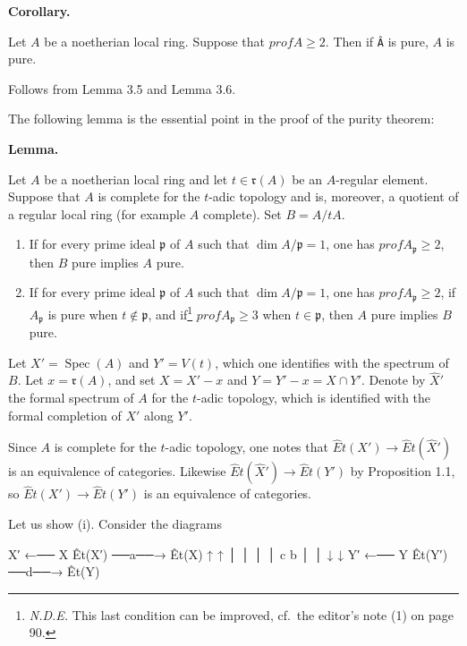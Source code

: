 \documentclass[
]{article}
\newenvironment{Shaded}{}{}
\newcommand{\NormalTok}[1]{#1}
\providecommand{\tightlist}{%
  \setlength{\itemsep}{0pt}\setlength{\parskip}{0pt}}
\begin{document}
\textbf{Corollary.}

Let \(A\) be a noetherian local ring. Suppose that
\(prof A \geqslant 2\). Then if \texttt{Â} is pure, \(A\) is pure.

Follows from Lemma 3.5 and Lemma 3.6.

The following lemma is the essential point in the proof of the purity
theorem:

\textbf{Lemma.}

Let \(A\) be a noetherian local ring and let \(t \in \mathfrak{r}(A)\)
be an \(A\)-regular element. Suppose that \(A\) is complete for the
\(t\)-adic topology and is, moreover, a quotient of a regular local ring
(for example \(A\) complete). Set \(B = A/tA\).

\begin{enumerate}
\def\labelenumi{\arabic{enumi}.}
\tightlist
\item
  If for every prime ideal \(\mathfrak{p}\) of \(A\) such that
  \(\dim A/\mathfrak{p} = 1\), one has
  \(prof A_{\mathfrak{p}} \geqslant 2\), then \(B\) pure implies \(A\)
  pure.
\item
  If for every prime ideal \(\mathfrak{p}\) of \(A\) such that
  \(\dim A/\mathfrak{p} = 1\), one has
  \(prof A_{\mathfrak{p}} \geqslant 2\), if \(A_{\mathfrak{p}}\) is pure
  when \(t \notin \mathfrak{p}\), and if\footnote{\emph{N.D.E.} This
    last condition can be improved, cf.~the editor's note (1) on page
    90.} \(prof A_{\mathfrak{p}} \geqslant 3\) when
  \(t \in \mathfrak{p}\), then \(A\) pure implies \(B\) pure.
\end{enumerate}

Let \(X' = \operatorname{Spec}(A)\) and \(Y' = V(t)\), which one
identifies with the spectrum of \(B\). Let \(x = \mathfrak{r}(A)\), and
set \(X = X' - {x}\) and \(Y = Y' - {x} = X \cap Y'\). Denote by
\(\hat{X}'\) the formal spectrum of \(A\) for the \(t\)-adic topology,
which is identified with the formal completion of \(X'\) along \(Y'\).

Since \(A\) is complete for the \(t\)-adic topology, one notes that
\(\hat{E}t(X') \to \hat{E}t(\hat{X}')\) is an equivalence of categories.
Likewise \(\hat{E}t(\hat{X}') \to \hat{E}t(Y')\) by Proposition 1.1, so
\(\hat{E}t(X') \to \hat{E}t(Y')\) is an equivalence of categories.

Let us show (i). Consider the diagrams

\begin{Shaded}
\begin{Highlighting}[]
\NormalTok{   X′  ←──  X                    Êt(X′)  ──a──→  Êt(X)}
\NormalTok{   ↑        ↑                       │              │}
\NormalTok{   │        │                       c              b}
\NormalTok{   │        │                       ↓              ↓}
\NormalTok{   Y′  ←──  Y                    Êt(Y′)  ──d──→  Êt(Y)}
\end{Highlighting}
\end{Shaded}
\end{document}
